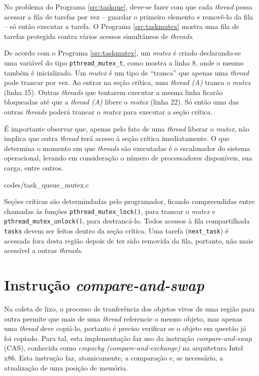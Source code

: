 \documentclass[ccc, pg2]{esinucpel}
\begin{document}
No problema do Programa \ref{src:taskque}, deve-se fazer com que cada {\it thread} possa acessar a fila de tarefas por vez -- guardar o primeiro elemento e removê-lo da fila  -- só então executar a tarefa. O Programa \ref{src:taskmutex} \cite{bib:advlinprog} mostra uma fila de tarefas protegida contra vários acessos simultâneos de {\it threads}. 

De acordo com o Programa \ref{src:taskmutex}, um {\it mutex} é criado declarando-se uma variável do tipo {\tt pthread\_mutex\_t}, como mostra a linha 8, onde o mesmo também é inicializado. Um {\it mutex} é um tipo de ``tranca'' que apenas uma {\it thread} pode trancar por vez. Ao entrar na seção crítica, uma {\it thread (A)} tranca o {\it mutex} (linha 15). Outras {\it threads} que tentarem executar a mesma linha ficarão bloqueadas até que a {\it thread (A)} libere o {\it mutex} (linha 22). Só então uma das outras {\it threads} poderá trancar o {\it mutex} para executar a seção crítica.

É importante observar que, apenas pelo fato de uma {\it thread} liberar o {\it mutex}, não implica que outra {\it thread} terá acesso à seção crítica imediatamente. O que determina o momento em que {\it threads} são executadas é o escalonador do sistema operacional, levando em consideração o número de processadores disponíveis, sua carga, entre outros.


								 {codes/task_queue_mutex.c}

Seções críticas são determindadas pelo programador, ficando compreendidas entre chamadas às funções {\tt pthread\_mutex\_lock()}, para trancar o {\it mutex} e {\tt pthread\_mutex\_unlock()}, para destrancá-lo. Todos acessos à fila compartilhada {\tt tasks} devem ser feitos dentro da seção crítica. Uma tarefa ({\tt next\_task}) é acessada fora desta região depois de ter sido removida da fila, portanto, não mais acessível a outras {\it threads}.

\section{Instrução \textit{compare-and-swap}}
Na coleta de lixo, o processo de tranferência dos objetos vivos de uma região para outra permite que mais de uma {\it thread} referencie o mesmo objeto, mas apenas uma {\it thread} deve copiá-lo, portanto é preciso verificar se o objeto em questão já foi copiado. Para tal, esta implementação faz uso da instrução {\it compare-and-swap} (CAS), conhecida como {\it cmpxchg (compare-and-exchange)} na arquitetura Intel x86. Esta instrução faz, atomicamente, a comparação e, se necessário, a atualização de uma posição de memória.
\end{document}
